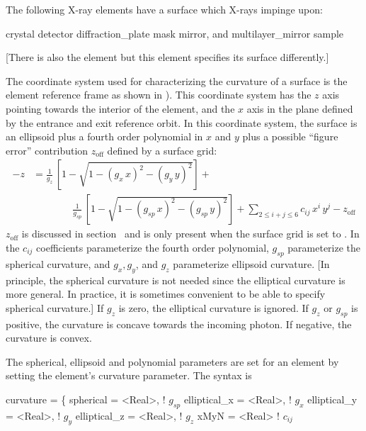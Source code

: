 The following X-ray elements have a surface which X-rays impinge upon:
\begin{example}
  crystal               
  detector              
  diffraction_plate     
  mask                  
  mirror, and           
  multilayer_mirror     
  sample                
\end{example}
[There is also the  element but this element specifies
its surface differently.]

The coordinate system used for characterizing the curvature of a surface is the element reference
frame as shown in ). This coordinate system has the $z$ axis pointing towards the
interior of the element, and the $x$ axis in the plane defined by the entrance and exit reference
orbit. In this coordinate system, the surface is an ellipsoid plus a fourth order polynomial in $x$
and $y$ plus a possible ``figure error'' contribution $z_\text{off}$ defined by a surface grid:
\begin{align}
  \label{xs2ij4}
  {-z} &= \frac{1}{g_z} \, \left[ 1 - \sqrt{1 - (g_x \, x)^2 - (g_y \, y)^2} \right] + \\
  &\qquad \qquad \frac{1}{g_{sp}} \, \left[ 1 - \sqrt{1 - (g_{sp} \, x)^2 - (g_{sp} \, y)^2} \right] + 
  \sum_{2 \le i+j \le 6} c_{ij} \, x^i \, y^j - z_\text{off} \nonumber
\end{align}
$z_\text{off}$ is discussed in section~ and is only present when the surface grid
 is set to . In  the $c_{ij}$ coefficients parameterize the
fourth order polynomial, $g_{sp}$ parameterize the spherical curvature, and $g_x, g_y$, and $g_z$
parameterize ellipsoid curvature. [In principle, the spherical curvature is not needed since the
elliptical curvature is more general. In practice, it is sometimes convenient to be able to specify
spherical curvature.]  If $g_z$ is zero, the elliptical curvature is ignored. If $g_z$ or $g_{sp}$
is positive, the curvature is concave towards the incoming photon. If negative, the curvature is
convex. 

The spherical, ellipsoid and polynomial parameters are set for an element by setting the element's
curvature parameter. The syntax is
\begin{example}
  curvature = \{
      spherical    = <Real>,   ! \(g_{sp}\)
      elliptical_x = <Real>,   ! \(g_{x}\)
      elliptical_y = <Real>,   ! \(g_{y}\)
      elliptical_z = <Real>,   ! \(g_{z}\)
      xMyN         = <Real>    ! \(c_{ij}\)
\end{example}

